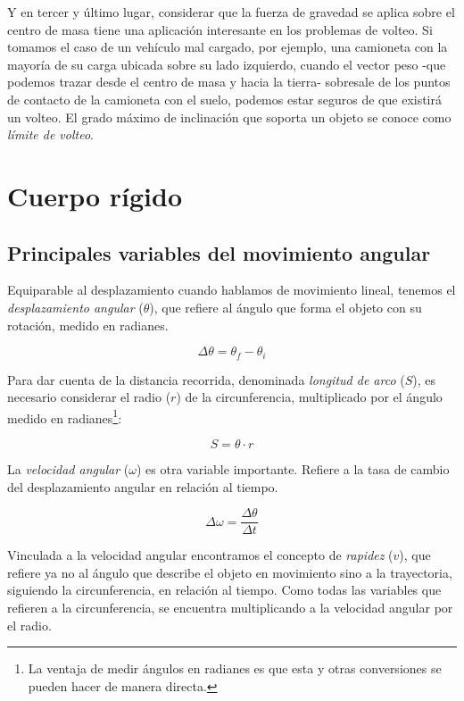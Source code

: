 \documentclass[12pt]{article}
\begin{document}
Y en tercer y último lugar,
considerar que la fuerza de gravedad se aplica sobre el centro de masa tiene una aplicación interesante en los problemas de volteo.
Si tomamos el caso de un vehículo mal cargado,
por ejemplo,
una camioneta con la mayoría de su carga ubicada sobre su lado izquierdo,
cuando el vector peso
-que podemos trazar desde el centro de masa y hacia la tierra-
sobresale de los puntos de contacto de la camioneta con el suelo,
podemos estar seguros de que existirá un volteo.
El grado máximo de inclinación que soporta un objeto se conoce como \textit{límite de volteo}.

\pagebreak

\section{Cuerpo rígido}

\subsection{Principales variables del movimiento angular}

Equiparable al desplazamiento cuando hablamos de movimiento lineal,
tenemos el \textit{desplazamiento angular} (\(\theta\)),
que refiere al ángulo que forma el objeto con su rotación,
medido en radianes.

\begin{equation}
	\Delta\theta = \theta_{f} - \theta_{i}
\end{equation}

Para dar cuenta de la distancia recorrida,
denominada \textit{longitud de arco} (\(S\)),
es necesario considerar el radio (\(r\)) de la circunferencia,
multiplicado por el ángulo medido en radianes\footnote{La ventaja de medir ángulos en radianes es que esta y otras conversiones se pueden hacer de manera directa.}:

\begin{equation}
	S = \theta\cdot r
\end{equation}

La \textit{velocidad angular} (\(\omega\)) es otra variable importante.
Refiere a la tasa de cambio del desplazamiento angular en relación al tiempo.

\begin{equation}
	\Delta\omega = \frac{\Delta\theta}{\Delta t}
\end{equation}

Vinculada a la velocidad angular encontramos el concepto de \textit{rapidez} (\(v\)),
que refiere ya no al ángulo que describe el objeto en movimiento sino a la trayectoria,
siguiendo la circunferencia,
en relación al tiempo.
Como todas las variables que refieren a la circunferencia,
se encuentra multiplicando a la velocidad angular por el radio.
\end{document}
